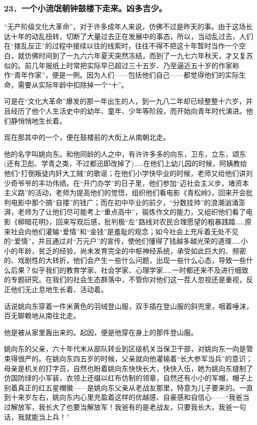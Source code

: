 \subsubsection*{23．一个小流氓朝钟鼓楼下走来。凶多吉少。}
\par “无产阶级文化大革命”，对于许多成年人来说，仿佛不过是昨天的事。由于这场长达十年的动乱扭转，切断了大量过去正在发展中的事态，所以，当动乱过去，人们在“拨乱反正”的过程中接续以往的线索时，往往不得不把这十年暂时当作一个空白，就仿佛时间到了一九六六年夏天突然冻结，而到了一九七六年秋天，才又复苏似的。前几年报纸上时常把实际早已超过三十五岁、乃至逼近五十岁的作家称作“青年作家”，便是一例。因为人们——包括他们自己——都觉得他们的实际生命，需要从实际年龄中扣除掉一个“十”。
\par 可是在“文化大革命”爆发的那一年出生的人，到一九八二年却已经整整十六岁，并且经历了他个人生活史中的幼年、童年、少年等阶段，而开始向青年时代演进。他们静悄悄地生长着。
\par 现在那其中的一个，便在鼓楼前的大街上从南朝北走。
\par 他的名字叫姚向东。和他同龄的人之中，有许许多多的向东，卫东，立东，颂东(还有卫彪、学青之类，不过都迅即改掉了)……在他们上幼儿园的时候，阿姨教给他们“打倒叛徒内奸大工贼”的歌谣；在他们小学快毕业的时候，老师又给他们讲刘少奇爷爷的丰功伟绩。在“开门办学”的日子里，他们参加“迈社会主义步，堵资本主义路”的活动，老师为提高他们的觉悟，组织他们看电影《青松岭》，回来开会批判电影中那个搞“自搂”的钱广；而在初中毕业的前夕，“分数挂帅”的浪潮汹涌澎湃，老师为了让他们尽可能考上“重点高中”，锻炼作文的能力，又组织他们看了电影《柳暗花明》，回来写观后感，批判极“左”路线对农民合理愿望的粗暴践踏……原来社会向他们灌输“爱情”和“金钱”是羞耻的观念；如今社会上充斥着无处不见的“爱情”，并且通过对“万元户”的宣传，使他们懂得了钱越多越光荣的道理……小小的年龄，贫乏的经验，尚未发育完全的中枢神经系统，承受如此巨大的、频密的、戏剧性的大转折，他们会产生一些什么问题，出现一些什么心态，导致一些什么后果？似乎我们的教育学家、社会学家、心理学家……一时都还来不及进行细致的专题研究。在我们的社会生态群落中，不管你对他们这一茬人忽视还是重视，反正他们无止息地生长着、活动着。
\par 话说姚向东穿着一件米黄色的羽绒登山服，双手插在登山服的斜兜里，咽着唾沫，百无聊赖地从南往北走。
\par 他是被从家里轰出来的。起因，便是他穿在身上的那件登山服。
\par 姚向东的父亲，六十年代末从部队转业到区级机关当保卫干部，对姚向东一向是管束得很严的。在姚向东四五岁的时候，父亲就向他灌输着“长大参军当兵”的意识；母亲是机关的打字员，自然也盼着姚向东快快长大，快快入伍，她为姚向东缝制了仿国防绿的小军装，衣领上还缀以红布仿制的领章，自然还有小小的军帽，帽子上别着真正的红五星帽徽——是姚向东父亲从老战友那里，特意为儿子要来的。一直到十来岁左右，姚向东内心里充盈着这样的优越感、自豪感和自信心——“我爸当过解放军，我长大了也要当解放军！我爸有的是老战友，只要我长大，我爸一句话，我就能当上兵！”

